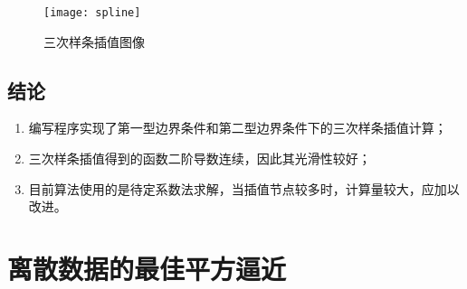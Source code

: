 \begin{figure}[ht]
    \centering
      \texttt{[image: spline]}
      \caption{三次样条插值图像}
      \label{fig:spline}
\end{figure}


\subsection{结论}

\begin{enumerate}[(1)]
    \item 编写程序实现了第一型边界条件和第二型边界条件下的三次样条插值计算；
    \item 三次样条插值得到的函数二阶导数连续，因此其光滑性较好；
    \item 目前算法使用的是待定系数法求解，当插值节点较多时，计算量较大，应加以改进。
\end{enumerate}

\clearpage
\section{离散数据的最佳平方逼近}


